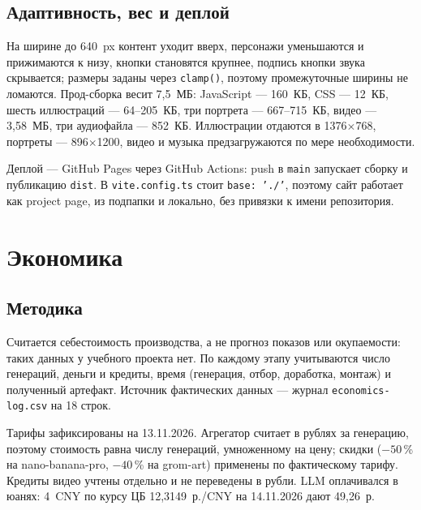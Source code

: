 \documentclass[12pt, a4paper]{article}
\begin{document}
\subsection{Адаптивность, вес и деплой}
На ширине до 640~px контент уходит вверх, персонажи уменьшаются и прижимаются к низу, кнопки становятся крупнее, подпись кнопки звука скрывается; размеры заданы через \texttt{clamp()}, поэтому промежуточные ширины не ломаются. Прод-сборка весит 7{,}5~МБ: JavaScript --- 160~КБ, CSS --- 12~КБ, шесть иллюстраций --- 64--205~КБ, три портрета --- 667--715~КБ, видео --- 3{,}58~МБ, три аудиофайла --- 852~КБ. Иллюстрации отдаются в 1376$\times$768, портреты --- 896$\times$1200, видео и музыка предзагружаются по мере необходимости.

Деплой --- GitHub Pages через GitHub Actions: push в \texttt{main} запускает сборку и публикацию \texttt{dist}. В \texttt{vite.config.ts} стоит \texttt{base: './'}, поэтому сайт работает как project page, из подпапки и локально, без привязки к имени репозитория.

\section{Экономика}

\subsection{Методика}
Считается себестоимость производства, а не прогноз показов или окупаемости: таких данных у учебного проекта нет. По каждому этапу учитываются число генераций, деньги и кредиты, время (генерация, отбор, доработка, монтаж) и полученный артефакт. Источник фактических данных --- журнал \texttt{economics-log.csv} на 18 строк.

Тарифы зафиксированы на 13.11.2026. Агрегатор считает в рублях за генерацию, поэтому стоимость равна числу генераций, умноженному на цену; скидки ($-50$\,\% на nano-banana-pro, $-40$\,\% на grom-art) применены по фактическому тарифу. Кредиты видео учтены отдельно и не переведены в рубли. LLM оплачивался в юанях: 4~CNY по курсу ЦБ 12{,}3149~р./CNY на 14.11.2026 дают 49{,}26~р.
\end{document}
